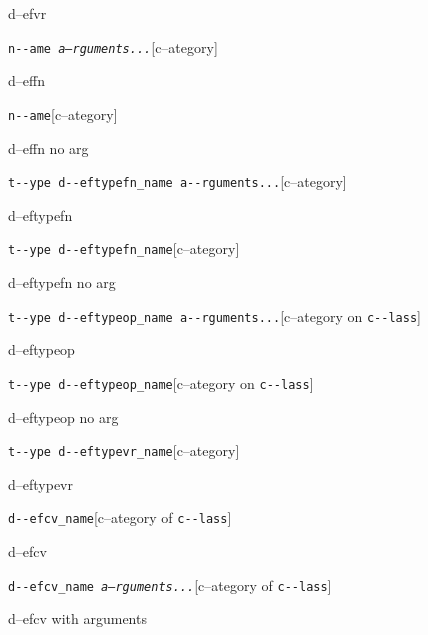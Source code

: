 \documentclass{book}
\begin{document}
%
d--efvr

\noindent\texttt{n{-}{-}ame \EmbracOn{}\textnormal{\textsl{a--rguments...}}\EmbracOff{}}\hfill[c--ategory]



%
d--effn

\noindent\texttt{n{-}{-}ame}\hfill[c--ategory]



%
d--effn no arg

\noindent\texttt{t{-}{-}ype d{-}{-}eftypefn\_name a{-}{-}rguments...}\hfill[c--ategory]



%
d--eftypefn

\noindent\texttt{t{-}{-}ype d{-}{-}eftypefn\_name}\hfill[c--ategory]



%
d--eftypefn no arg

\noindent\texttt{t{-}{-}ype d{-}{-}eftypeop\_name a{-}{-}rguments...}\hfill[c--ategory on \texttt{c{-}{-}lass}]



%
d--eftypeop

\noindent\texttt{t{-}{-}ype d{-}{-}eftypeop\_name}\hfill[c--ategory on \texttt{c{-}{-}lass}]



%
d--eftypeop no arg

\noindent\texttt{t{-}{-}ype d{-}{-}eftypevr\_name}\hfill[c--ategory]



%
d--eftypevr

\noindent\texttt{d{-}{-}efcv\_name}\hfill[c--ategory of \texttt{c{-}{-}lass}]



%
d--efcv

\noindent\texttt{d{-}{-}efcv\_name \EmbracOn{}\textnormal{\textsl{a--rguments...}}\EmbracOff{}}\hfill[c--ategory of \texttt{c{-}{-}lass}]



%
d--efcv with arguments
\end{document}
